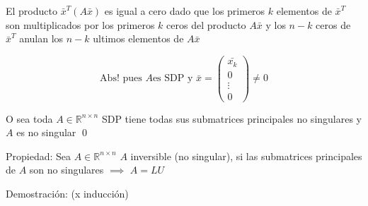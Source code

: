 \begin{itemize}
El producto $\bar{x}^{T} (A \bar{x} )$ es igual a cero dado que los primeros $k$ elementos de $\bar{x}^{T}$ son multiplicados por los primeros $k$ ceros del producto $A \bar{x}$ y los $n-k$ ceros de $\bar{x}^{T}$ anulan los $n-k$ ultimos elementos de $A \bar{x}$

\[\text{Abs! pues } A \text{es SDP y } \bar{x} = \begin{pmatrix} \bar{x_{k}} \\ 0 \\ \vdots \\ 0 \end{pmatrix} \neq 0\]

O sea toda $A \in \mathbb{R}^{n \times n}$ SDP tiene todas sus submatrices principales no singulares y $A$ es no singular \qed

\end{itemize}

Propiedad: Sea $A \in \mathbb{R}^{n \times n}$ $A$ inversible (no singular), si las submatrices principales de $A$ son no singulares $\implies$ $A = L U$

Demostración: (x inducción)

